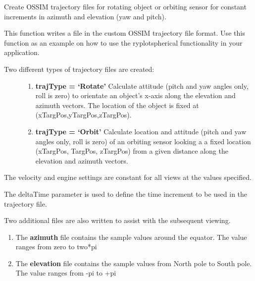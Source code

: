 \documentclass[a4paper,10pt,english]{sphinxmanual}
\begin{document}

\begin{fulllineitems}
\label{ryplotspherical:pyradi.ryplotspherical.writeOSSIMTrajElevAzim}
Create OSSIM trajectory files for rotating object or orbiting sensor
for constant increments in azimuth and elevation (yaw and pitch).

This function writes a file in the custom OSSIM trajectory file format.
Use this function as an example on how to use the ryplotspherical
functionality in your application.
\begin{description}
\item[{Two different types of trajectory files are created:}] \leavevmode\begin{enumerate}
\item {} 
\textbf{trajType = `Rotate'}
Calculate attitude (pitch and yaw angles only, roll is zero) to
orientate an object's x-axis along the elevation and azimuth vectors.
The location of the object is fixed at (xTargPos,yTargPos,zTargPos).

\item {} 
\textbf{trajType = `Orbit'}
Calculate location and attitude (pitch and yaw angles only, roll is
zero) of an orbiting sensor looking a a fixed location
(xTargPos, TargPos, zTargPos) from a given distance along the 
elevation and azimuth vectors.

\end{enumerate}

\end{description}

The velocity and engine settings are constant for all views at the
values specified.

The deltaTime parameter is used to define the time increment to be
used in the trajectory file.

Two additional files are also written to assist with the subsequent
viewing.
\begin{enumerate}
\item {} 
The \textbf{azimuth} file contains the sample values around the equator. 
The value ranges from zero to two*pi

\item {} 
The \textbf{elevation} file contains the sample values from North pole to South pole. 
The value ranges from -pi to +pi


\end{enumerate}
\end{fulllineitems}
\end{document}
